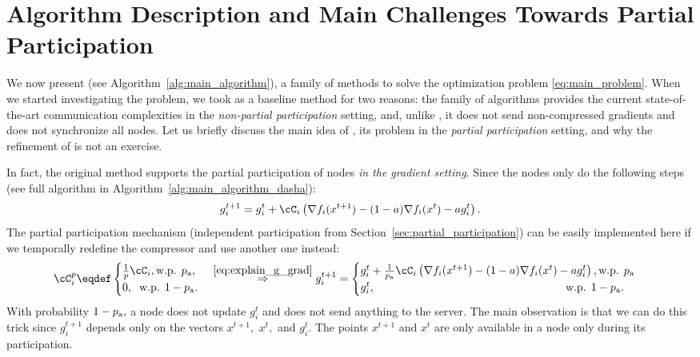 \documentclass{article}
\newcommand{\algorithmname}{DASHA-PP}
\newcommand*{\probavailable}{\ensuremath{p_{\textnormal{a}}}}
\begin{document}
\section{Algorithm Description and Main Challenges Towards Partial Participation}

We now present \algname{\algorithmname} (see Algorithm~\ref{alg:main_algorithm}), a family of methods to solve the optimization problem \eqref{eq:main_problem}. When we started investigating the problem, we took  as a baseline method for two reasons: the family of algorithms  provides the current state-of-the-art communication complexities in the \emph{non-partial participation} setting, and, unlike , it does not send non-compressed gradients and does not synchronize all nodes. Let us briefly discuss the main idea of , its problem in the \emph{partial participation} setting, and why the refinement of  is not an exercise.

In fact, the original  method supports the partial participation of nodes \emph{in the gradient setting}. Since the nodes only do the following steps (see full algorithm in Algorithm~\ref{alg:main_algorithm_dasha}):
\begin{align}
  \label{eq:explain_g_grad}
  g^{t+1}_i = g^{t}_i + \cC_i\left(\nabla f_i(x^{t+1}) - (1 - a)\nabla f_i(x^{t}) - a g^{t}_i\right).
\end{align}
The partial participation mechanism (independent participation from Section~\ref{sec:partial_participation}) can be easily implemented here if we temporally redefine the compressor and use another one instead:
\begin{align*}
  \cC_{i}^p \eqdef \begin{cases}
    \frac{1}{p}\cC_{i},\textnormal{w.p. } \probavailable,\\
    0, \hspace{0.2cm} \textnormal{w.p. } 1 - \probavailable.
  \end{cases} \overset{\eqref{eq:explain_g_grad}}{\Rightarrow} g^{t+1}_i = \begin{cases}
    g^{t}_i + \frac{1}{\probavailable}\cC_i\left(\nabla f_i(x^{t+1}) - (1 - a)\nabla f_i(x^{t}) - a g^{t}_i\right), \textnormal{w.p. } \probavailable\\
    g^{t}_i, \hspace{6.0cm}\textnormal{w.p. } 1 - \probavailable.
  \end{cases}
\end{align*}
With probability $1 - \probavailable,$ a node does not update $g_i^{t}$ and does not send anything to the server. The main observation is that we can do this trick since $g^{t+1}_i$ depends only on the vectors $x^{t+1},$ $x^{t},$ and $g^{t}_i$. The points $x^{t+1}$ and $x^{t}$ are only available in a node only during its participation.
\end{document}
